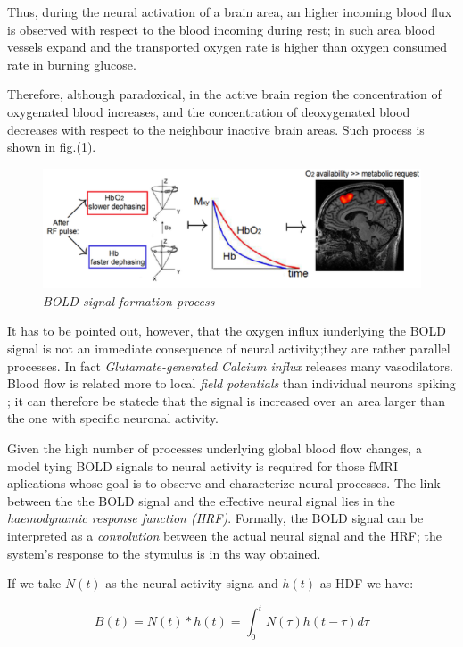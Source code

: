 \documentclass[12pt,openright,twoside,a4paper]{book}
\begin{document}
Thus, during the neural activation of a brain area, an higher incoming blood flux is observed with respect to the blood incoming during rest; in such area blood vessels expand and the transported oxygen rate is higher than oxygen consumed rate in burning glucose. 

Therefore, although paradoxical, in the active brain region the concentration of oxygenated blood increases, and the concentration of deoxygenated blood decreases with respect to the neighbour inactive brain areas. Such process is shown in fig.(\ref{bold}).

\begin{figure}[!h]
\centering
\includegraphics[scale=0.75]{bold}
\caption{\textit{BOLD signal formation process}}
\label{bold}
\end{figure}

It has to be pointed out, however, that the oxygen influx iunderlying the BOLD signal is not an immediate consequence of neural activity;they are rather parallel processes. 
In fact \textit{Glutamate-generated Calcium influx} releases many vasodilators. 
Blood flow is related more to local \textit{field potentials} than individual neurons spiking \cite{bold}; it can therefore be statede that the signal is increased over an area larger than the one with specific neuronal activity.

Given the high number of processes underlying global blood flow changes, a model tying BOLD signals to neural activity is required for those fMRI aplications whose goal is to observe and characterize neural processes.
The link between the the BOLD signal and the effective neural signal lies in the \textit{haemodynamic response function (HRF)}.
Formally, the BOLD signal can be interpreted as a \textit{convolution} between the actual neural signal and the HRF; the system's response to the stymulus is in ths way obtained.

If we take $N(t)$ as the neural activity signa and $h(t)$ as HDF we have:

\begin{equation}
B(t)=N(t)\ast h(t)=\int_0^t N(\tau)h(t-\tau)d\tau
\label{hdfconv}
\end{equation}
\end{document}
